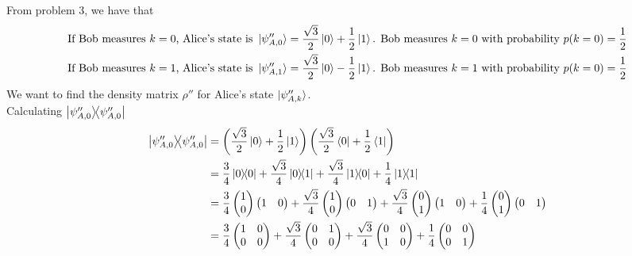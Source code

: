 From problem 3, we have that 
\begin{align*}
    \text{If Bob measures } k=0 \text{, Alice's state is } \ket{\psi''_{A,0}} = \frac{\sqrt{3}}{2} \ket{0} + \frac{1}{2} \ket{1} \text{. Bob measures } k=0 \text{ with probability } p(k=0) = \frac{1}{2} \\ 
    \text{If Bob measures } k=1 \text{, Alice's state is } \ket{\psi''_{A,1}} = \frac{\sqrt{3}}{2} \ket{0} - \frac{1}{2} \ket{1} \text{. Bob measures } k=1 \text{ with probability } p(k=0) = \frac{1}{2}
\end{align*}
We want to find the density matrix $\rho''$ for Alice's state $\ket{\psi''_{A,k}}$. \\
Calculating $\ketbra{\psi''_{A,0}}$
\begin{align}
    \ketbra{\psi''_{A,0}} &= \left(\frac{\sqrt{3}}{2} \ket{0} + \frac{1}{2} \ket{1}\right)\left(\frac{\sqrt{3}}{2} \bra{0} + \frac{1}{2} \bra{1}\right) \\
    &= \frac{3}{4}\ketbra{0} + \frac{\sqrt{3}}{4}\ketbra{0}{1} + \frac{\sqrt{3}}{4}\ketbra{1}{0} + \frac{1}{4} \ketbra{1}{1} \\
    &= \frac{3}{4}\begin{pmatrix}1 \\ 0\end{pmatrix}\begin{pmatrix}1 & 0\end{pmatrix} + \frac{\sqrt{3}}{4}\begin{pmatrix}1 \\ 0\end{pmatrix}\begin{pmatrix}0 & 1\end{pmatrix} +  \frac{\sqrt{3}}{4}\begin{pmatrix}0 \\ 1\end{pmatrix}\begin{pmatrix}1 & 0\end{pmatrix}  + \frac{1}{4}\begin{pmatrix}0 \\ 1\end{pmatrix}\begin{pmatrix}0 & 1\end{pmatrix} \\
    &= \frac{3}{4}\begin{pmatrix}1 & 0 \\ 0 & 0\end{pmatrix} + \frac{\sqrt{3}}{4}\begin{pmatrix} 0 & 1 \\ 0 & 0\end{pmatrix} + \frac{\sqrt{3}}{4}\begin{pmatrix}0 & 0 \\ 1 & 0\end{pmatrix} + \frac{1}{4} \begin{pmatrix}0 & 0 \\ 0 & 1\end{pmatrix} \\

\end{align}
